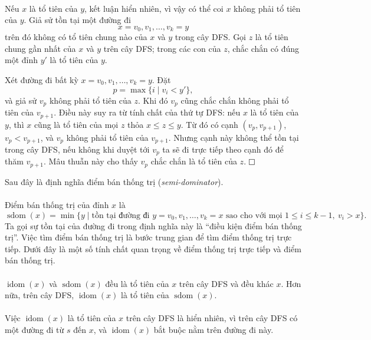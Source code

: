 \documentclass[11pt]{article}
\newcommand{\proofbox}{\ensuremath{\vcenter{\hrule height 0.45pt
  \hbox{\vrule width 0.45pt height 6pt\kern 6pt\vrule width 0.45pt}
  \hrule height 0.45pt}}}
\begin{document}
\paragraph{}
Nếu \(x\) là tổ tiên của \(y\), kết luận hiển nhiên, vì vậy có thể coi \(x\)
không phải tổ tiên của \(y\). Giả sử tồn tại một đường đi
\[
x=v_0,v_1,\ldots,v_k=y
\]
trên đó không có tổ tiên chung nào của \(x\) và \(y\) trong cây DFS. Gọi \(z\)
là tổ tiên chung gần nhất của \(x\) và \(y\) trên cây DFS; trong các con của
\(z\), chắc chắn có đúng một đỉnh \(y'\) là tổ tiên của \(y\).

Xét đường đi bất kỳ \(x=v_0,v_1,\ldots,v_k=y\). Đặt
\[
p=\max\{i\mid v_i<y'\},
\]
và giả sử \(v_p\) không phải tổ tiên của \(z\). Khi đó \(v_p\) cũng chắc chắn
không phải tổ tiên của \(v_{p+1}\). Điều này suy ra từ tính chất của thứ tự DFS:
nếu \(x\) là tổ tiên của \(y\), thì \(x\) cũng là tổ tiên của mọi \(z\) thỏa
\(x\le z\le y\). Từ đó có cạnh \((v_p,v_{p+1})\), \(v_p<v_{p+1}\), và \(v_p\)
không phải tổ tiên của \(v_{p+1}\). Nhưng cạnh này không thể tồn tại trong cây
DFS, nếu không khi duyệt tới \(v_p\) ta sẽ đi trực tiếp theo cạnh đó để thăm
\(v_{p+1}\). Mâu thuẫn này cho thấy \(v_p\) chắc chắn là tổ tiên của \(z\).
\proofbox

Sau đây là định nghĩa điểm bán thống trị (\emph{semi-dominator}).

\paragraph{}
Điểm bán thống trị của đỉnh \(x\) là
\[
\operatorname{sdom}(x)=\min\{y\mid \text{tồn tại đường đi }
y=v_0,v_1,\ldots,v_k=x\text{ sao cho với mọi }1\le i\le k-1,\ v_i>x\}.
\]
Ta gọi sự tồn tại của đường đi trong định nghĩa này là ``điều kiện điểm bán
thống trị''. Việc tìm điểm bán thống trị là bước trung gian để tìm điểm thống
trị trực tiếp. Dưới đây là một số tính chất quan trọng về điểm thống trị trực
tiếp và điểm bán thống trị.

\paragraph{}
\(\operatorname{idom}(x)\) và \(\operatorname{sdom}(x)\) đều là tổ tiên của
\(x\) trên cây DFS và đều khác \(x\). Hơn nữa, trên cây DFS,
\(\operatorname{idom}(x)\) là tổ tiên của \(\operatorname{sdom}(x)\).

\paragraph{}
Việc \(\operatorname{idom}(x)\) là tổ tiên của \(x\) trên cây DFS là hiển
nhiên, vì trên cây DFS có một đường đi từ \(s\) đến \(x\), và
\(\operatorname{idom}(x)\) bắt buộc nằm trên đường đi này.
\end{document}
